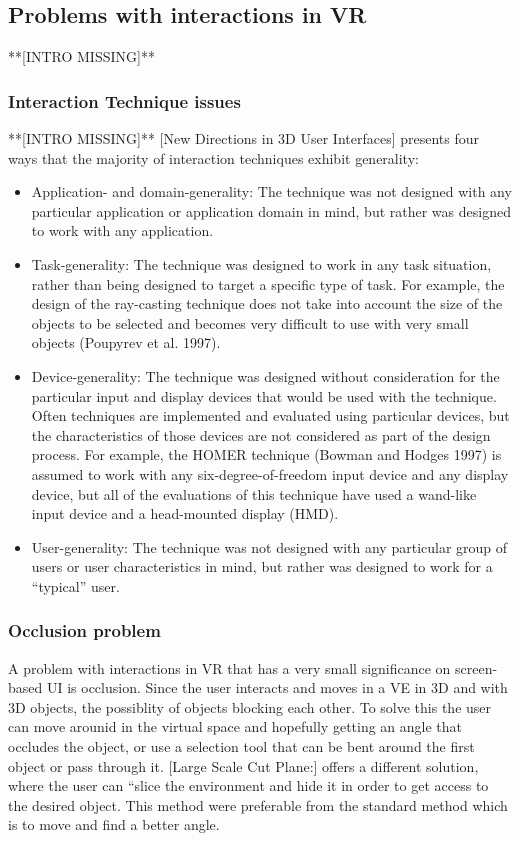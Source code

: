 \subsection{Problems with interactions in VR}
**[INTRO MISSING]**
\subsubsection{Interaction Technique issues}
**[INTRO MISSING]**
[New Directions in 3D User Interfaces] presents four ways that the majority of interaction techniques exhibit generality:
\begin{itemize}
  \item Application- and domain-generality: The technique was not designed with any particular application or application domain in mind, but rather was designed to work with any application.
  \item Task-generality: The technique was designed to work in any task situation, rather than being designed to target a specific type of task. For example, the design of the ray-casting technique does not take into account the size of the objects to be selected and becomes very difficult to use with very small objects (Poupyrev et al. 1997).
  \item Device-generality: The technique was designed without consideration for the particular input and display devices that would be used with the technique. Often techniques are implemented and evaluated using particular devices, but the characteristics of those devices are not considered as part of the design process. For example, the HOMER technique (Bowman and Hodges 1997) is assumed to work with any six-degree-of-freedom input device and any display device, but all of the evaluations of this technique have used a wand-like input device and a head-mounted display (HMD).
  \item User-generality: The technique was not designed with any particular group of users or user characteristics in mind, but rather was designed to work for a “typical” user.
\end{itemize}

\subsubsection{Occlusion problem}
A problem with interactions in VR that has a very small significance on screen-based UI is occlusion. Since the user interacts and moves in a VE in 3D and with 3D objects, the possiblity of objects blocking each other. To solve this the user can move arounid in the virtual space and hopefully getting an angle that occludes the object, or use a selection tool that can be bent around the first object or pass through it. [Large Scale Cut Plane:] offers a different solution, where the user can “slice the environment and hide it in order to get access to the desired object.
This method were preferable from the standard method which is to move and find a better angle.
